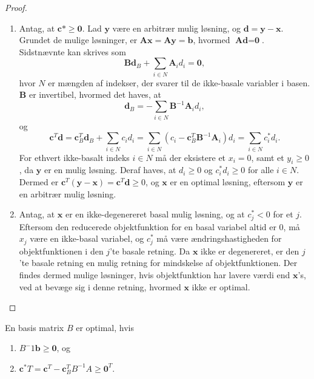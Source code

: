 %
\begin{proof}
\begin{enumerate}[label = (\alph*)]
\item Antag, at $\textbf{c}* \geq \textbf{0}$. Lad $\textbf{y}$ være en arbitrær mulig løsning, og $\textbf{d} = \textbf{y} - \textbf{x}$. Grundet de mulige løsninger, er $\textbf{A} \textbf{x} = \textbf{A} \textbf{y} = \textbf{b}$, hvormed $\textbf{A} \textbf{d} = \textbf{0}$. Sidstnævnte kan skrives som 
$$\textbf{B} \textbf{d}_B + \sum_{i \in N} \textbf{A}_i d_i = \textbf{0},$$
hvor $N$ er mængden af indekser, der svarer til de ikke-basale variabler i basen. %
$\textbf{B}$ er invertibel, hvormed det haves, at 
$$\textbf{d}_B = -\sum_{i \in N} \textbf{B}^{-1} \textbf{A}_i d_i ,$$
og
$$\textbf{c}^T \textbf{d} = \textbf{c}^T_B \textbf{d}_B + \sum_{i \in N} c_i d_i = \sum_{i \in N} (c_i - \textbf{c}^T_B \textbf{B}^{-1} \textbf{A}_i) d_i = \sum_{i \in N} c^*_i d_i .$$
For ethvert ikke-basalt indeks $i \in N$ må der eksistere et $x_i = 0$, samt et $y_i \geq 0$, da $\textbf{y}$ er en mulig løsning. 
Deraf haves, at $d_i \geq 0$ og $c^*_i d_i \geq 0$ for alle $i \in N$. 
Dermed er $\textbf{c}^T (\textbf{y} - \textbf{x} ) = \textbf{c}^T \textbf{d} \geq 0$, og $\textbf{x}$ er en optimal løsning, eftersom $\textbf{y}$ er en arbitrær mulig løsning. 
%
%
\item Antag, at $\mathbf{x}$ er en ikke-degenereret basal mulig løsning, og at $c^*_j < 0$ for et $j$. Eftersom den reducerede objektfunktion for en basal variabel altid er $0$, må $x_j$ være en ikke-basal variabel, og $c^*_j$ må være ændringshastigheden for objektfunktionen i den $j$'te basale retning. 
Da $\textbf{x}$ ikke er degenereret, er den $j$'te basale retning en mulig retning for mindskelse af objektfunktionen. 
Der findes dermed mulige løsninger, hvis objektfunktion har lavere værdi end $\textbf{x}$'s, ved at bevæge sig i denne retning, hvormed $\textbf{x}$ ikke er optimal. 
\end{enumerate}
\end{proof}
%
%
\begin{defn}{}{}
En basis matrix $B$ er optimal, hvis
\begin{enumerate}[label = (\alph*)]
\item $B^-1 \mathbf{b} \geq \mathbf{0}$, og
\item $\mathbf{c}^*T = \mathbf{c}^T - \mathbf{c}_B^T B^{-1} A \geq \mathbf{0}^T$.
\end{enumerate}
\end{defn}
